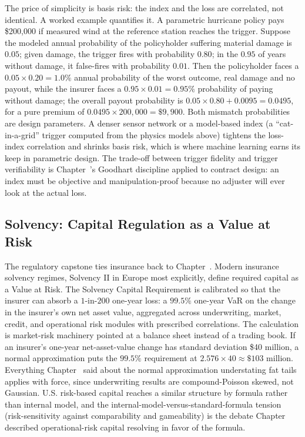 \documentclass[../ai_in_finance]{subfiles}
\begin{document}
The price of simplicity is basis risk: the index and the loss are correlated, not identical. A worked example quantifies it. A parametric hurricane policy pays \$200{,}000 if measured wind at the reference station reaches the trigger. Suppose the modeled annual probability of the policyholder suffering material damage is $0.05$; given damage, the trigger fires with probability $0.80$; in the $0.95$ of years without damage, it false-fires with probability $0.01$. Then the policyholder faces a $0.05 \times 0.20 = 1.0\%$ annual probability of the worst outcome, real damage and no payout, while the insurer faces a $0.95 \times 0.01 = 0.95\%$ probability of paying without damage; the overall payout probability is $0.05 \times 0.80 + 0.0095 = 0.0495$, for a pure premium of $0.0495 \times 200{,}000 = \$9{,}900$. Both mismatch probabilities are design parameters. A denser sensor network or a model-based index (a ``cat-in-a-grid'' trigger computed from the physics models above) tightens the loss-index correlation and shrinks basis risk, which is where machine learning earns its keep in parametric design. The trade-off between trigger fidelity and trigger verifiability is Chapter~'s Goodhart discipline applied to contract design: an index must be objective and manipulation-proof because no adjuster will ever look at the actual loss.

\subsection{Solvency: Capital Regulation as a Value at Risk}
\label{sec:ins-solvency}

The regulatory capstone ties insurance back to Chapter~. Modern insurance solvency regimes, Solvency II in Europe most explicitly, define required capital as a Value at Risk. The Solvency Capital Requirement is calibrated so that the insurer can absorb a $1$-in-$200$ one-year loss: a $99.5\%$ one-year VaR on the change in the insurer's own net asset value, aggregated across underwriting, market, credit, and operational risk modules with prescribed correlations. The calculation is market-risk machinery pointed at a balance sheet instead of a trading book. If an insurer's one-year net-asset-value change has standard deviation \$40 million, a normal approximation puts the $99.5\%$ requirement at $2.576 \times 40 \approx \$103$ million. Everything Chapter~ said about the normal approximation understating fat tails applies with force, since underwriting results are compound-Poisson skewed, not Gaussian. U.S. risk-based capital reaches a similar structure by formula rather than internal model, and the internal-model-versus-standard-formula tension (risk-sensitivity against comparability and gameability) is the debate Chapter~ described operational-risk capital resolving in favor of the formula.
\end{document}
